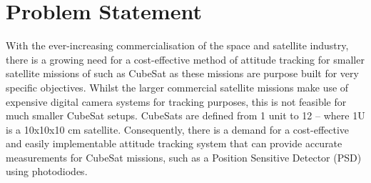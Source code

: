 \section{Problem Statement}
With the ever-increasing commercialisation of the space and satellite industry, there is a growing need for a cost-effective method of attitude tracking for smaller satellite missions of such as CubeSat as these missions are purpose built for very specific objectives. Whilst the larger commercial satellite missions make use of expensive digital camera systems for tracking purposes, this is not feasible for much smaller CubeSat setups. CubeSats are defined from 1 unit to 12 -- where 1U is a 10x10x10 cm satellite. Consequently, there is a demand for a cost-effective and easily implementable attitude tracking system that can provide accurate measurements for CubeSat missions, such as a Position Sensitive Detector (PSD) using photodiodes.